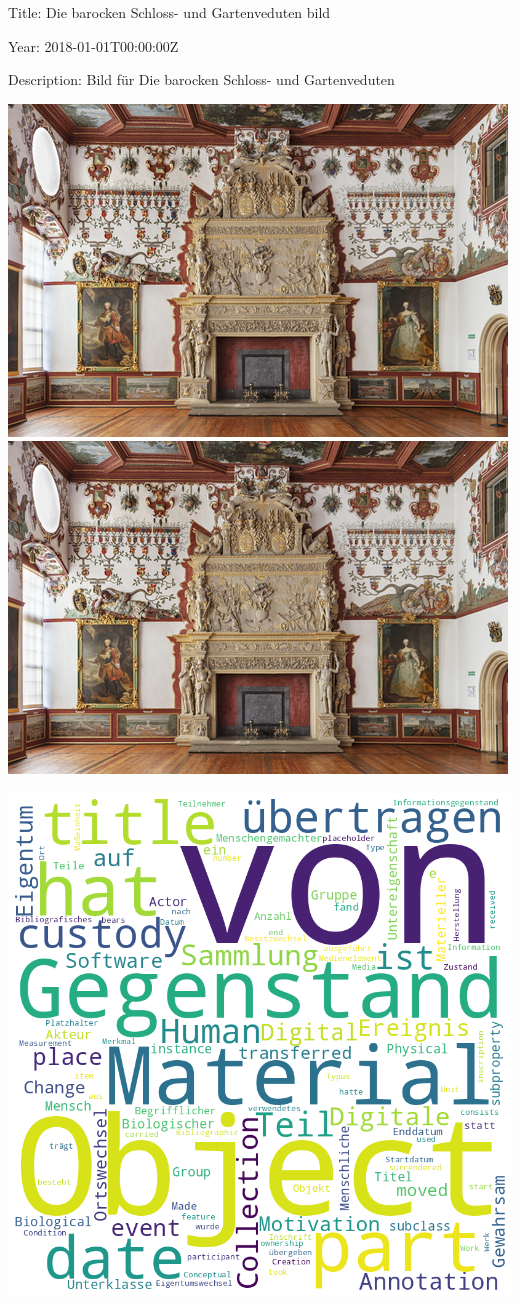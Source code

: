 \documentclass{book}
\makeatletter
\def\maxwidth{\ifdim\Gin@nat@width>\linewidth\linewidth
\else\Gin@nat@width\fi}
\let\Oldincludegraphics\includegraphics
\renewcommand{\includegraphics}[1]{\Oldincludegraphics[width=\maxwidth]{#1}}
\makeatother
\begin{document}
Title: Die barocken Schloss- und Gartenveduten bild

Year: 2018-01-01T00:00:00Z

Description: Bild für Die barocken Schloss- und Gartenveduten

\includegraphics{section_files/figure-pdf/cell-4-output-2.png}
\includegraphics{section_files/figure-pdf/cell-4-output-3.png}

\includegraphics{section_files/figure-pdf/cell-5-output-1.png}
\end{document}
